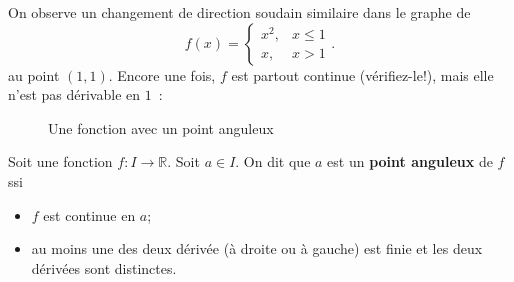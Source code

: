 \documentclass[a4paper,12pt]{article}
\begin{document}
\begin{exemple}[label=ex:anguleux]
	\tcblower
On observe un changement de direction soudain similaire dans le graphe de
$$f(x) = \begin{cases}
    x^2, & x \le 1 \\
    x, & x > 1 \end{cases}.$$
au point $(1, 1)$. Encore une fois, $f$ est partout continue (vérifiez-le!), mais elle n'est pas dérivable en $1$~:
\vspace{10cm}
\end{exemple}
\begin{figure}[h]
    \centering
    \caption{Une fonction avec un point anguleux}
\end{figure}

\begin{definition}
	\tcblower
	Soit une fonction $f:I\rightarrow \mathbb{R}$. Soit $a\in I$. On dit que $a$ est un {\bfseries point anguleux} de $f$ ssi 
	\begin{itemize}
		\item $f$ est continue en $a$;
		\item au moins une des deux dérivée (à droite ou à gauche) est finie et les deux dérivées sont distinctes.
	\end{itemize}
\end{definition}

\end{document}
